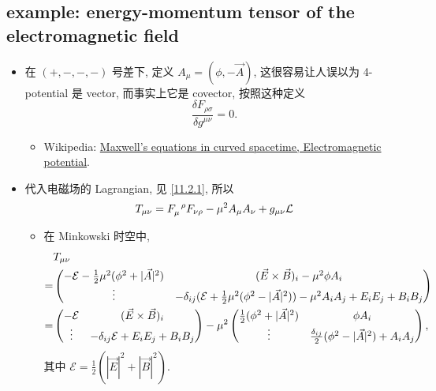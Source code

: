 \subsection{example: energy-momentum tensor of the electromagnetic field} \label{subsection D.4.1}
\begin{itemize}
	\item 在 $(+, -, -, -)$ 号差下, 定义 $A_\mu = (\phi, - \vec{A})$, 这很容易让人误以为 4-potential 是 vector, 而事实上它是 covector, 按照这种定义
	\begin{equation}
		\frac{\delta F_{\rho \sigma}}{\delta g^{\mu \nu}} = 0.
	\end{equation}
	\begin{itemize}
		\item Wikipedia: \href{https://en.wikipedia.org/wiki/Maxwell%27s_equations_in_curved_spacetime#Electromagnetic_potential}{Maxwell's equations in curved spacetime, Electromagnetic potential}.
	\end{itemize}
	
	\item 代入电磁场的 Lagrangian, 见 \eqref{11.2.1}, 所以
	\begin{equation}
		T_{\mu \nu} = \tensor{F}{_\mu^\rho} F_{\nu \rho} - \mu^2 A_\mu A_\nu + g_{\mu \nu} \mathcal{L}
	\end{equation}
	
	\begin{itemize}
		\item 在 Minkowski 时空中,
		\begin{align}
			& T_{\mu \nu} \notag \\
			=& \begin{pmatrix}
				- \mathcal{E} - \frac{1}{2} \mu^2 (\phi^2 + |\vec{A}|^2) & (\vec{E} \times \vec{B})_i - \mu^2 \phi A_i \\
				\vdots & - \delta_{i j} (\mathcal{E} + \frac{1}{2} \mu^2 (\phi^2 - |\vec{A}|^2)) - \mu^2 A_i A_j + E_i E_j + B_i B_j
			\end{pmatrix} \notag \\
			=& \begin{pmatrix}
				- \mathcal{E} & (\vec{E} \times \vec{B})_i \\
				\vdots & - \delta_{i j} \mathcal{E} + E_i E_j + B_i B_j
			\end{pmatrix} - \mu^2 \begin{pmatrix}
				\frac{1}{2} (\phi^2 + |\vec{A}|^2) & \phi A_i \\
				\vdots & \frac{\delta_{i j}}{2} (\phi^2 - |\vec{A}|^2) + A_i A_j
			\end{pmatrix},
		\end{align}
		其中 $\mathcal{E} = \frac{1}{2} (|\vec{E}|^2 + |\vec{B}|^2)$.
		

\end{itemize}
\end{itemize}
